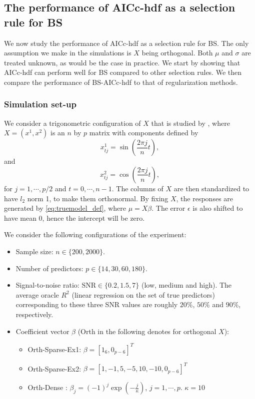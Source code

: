 \subsection{The performance of AICc-hdf as a selection rule for BS}
We now study the performance of AICc-hdf as a selection rule for BS. The only assumption we make in the simulations is $X$ being orthogonal. Both $\mu$ and $\sigma$ are treated unknown, as would be the case in practice. We start by showing that AICc-hdf can perform well for BS compared to other selection rules. We then compare the performance of BS-AICc-hdf to that of regularization methods. 

\subsubsection{Simulation set-up}
\label{sec:simulation_setup_orthx}
We consider a trigonometric configuration of $X$ that is studied by \citet{Hurvich1991}, where $X=(x^1,x^2)$ is an $n$ by $p$ matrix with components defined by 
$$ x_{tj}^1 = \sin\left(\frac{2\pi j}{n}t\right),$$
and 
$$ x_{tj}^2 = \cos\left(\frac{2\pi j}{n}t\right),$$
for $j=1,\cdots,p/2$ and $t=0,\cdots,n-1$. The columns of $X$ are then standardized to have $l_2$ norm 1, to make them orthonormal. By fixing $X$, the responses are generated by \eqref{eq:truemodel_def}, where $\mu=X\beta$. The error $\epsilon$ is also shifted to have mean $0$, hence the intercept will be zero. 

We consider the following configurations of the experiment:
\begin{itemize}
	\item Sample size: $n \in \{200, 2000\}$.
	\item Number of predictors: $p \in \{14,30,60,180\}$.
	\item Signal-to-noise ratio: $\text{SNR} \in \{0.2,1.5,7\}$ (low, medium and high). The average oracle $R^2$ (linear regression on the set of true predictors) corresponding to these three SNR values are roughly $20\%$, $50\%$ and $90\%$, respectively.
	\item Coefficient vector $\beta$ (Orth in the following denotes for orthogonal $X$):
	\begin{itemize}
		\item Orth-Sparse-Ex1: $\beta=[1_6,0_{p-6}]^T$
		\item Orth-Sparse-Ex2: $\beta=[1,-1,5,-5,10,-10,0_{p-6}]^T$
		\item Orth-Dense \citep{Taddy2017}: $\beta_j = (-1)^j \exp(-\frac{j}{\kappa})$, $j=1,\cdots,p$. $\kappa=10$ 
	\end{itemize}
\end{itemize}


